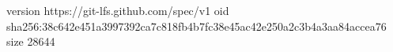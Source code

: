 version https://git-lfs.github.com/spec/v1
oid sha256:38c642e451a3997392ca7c818fb4b7fc38e45ac42e250a2c3b4a3aa84accea76
size 28644
